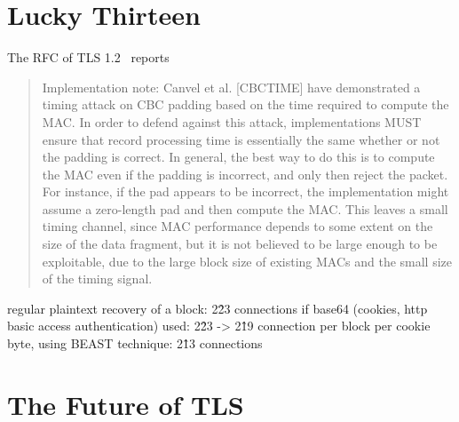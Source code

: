 \documentclass[10pt,conference,a4paper]{IEEEtran}
\begin{document}
\section{Lucky Thirteen}
\label{sec:lucky}
The RFC of TLS 1.2~\cite{ietf2008transport} reports
\begin{quote}
Implementation note: Canvel et al. [CBCTIME] have demonstrated a timing attack on CBC padding based on the time required to compute the MAC.  In order to defend against this attack, implementations MUST ensure that record processing time is essentially the same whether or not the padding is correct.  In general, the best way to do this is to compute the MAC even if the padding is incorrect, and only then reject the packet.  For instance, if the pad appears to be incorrect, the implementation might assume a zero-length pad and then compute the MAC.  This leaves a small timing channel, since MAC performance depends to some extent on the size of the data fragment, but it is not believed to be large enough to be exploitable, due to the large block size of existing MACs and the small size of the timing signal.
\end{quote}

regular plaintext recovery of a block: 2\^23 connections
if base64 (cookies, http basic access authentication) used: 2\^23 -> 2\^19 connection per block
per cookie byte, using BEAST technique: 2\^13 connections



\section{The Future of TLS}
\label{sec:future}




%

\end{document}
